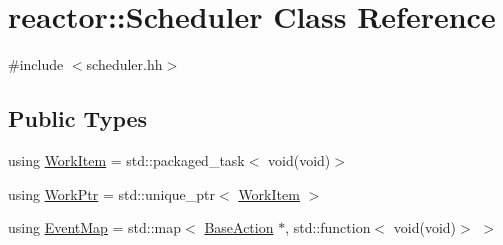 \hypertarget{classreactor_1_1Scheduler}{}\section{reactor\+:\+:Scheduler Class Reference}
\label{classreactor_1_1Scheduler}


{\ttfamily \#include $<$scheduler.\+hh$>$}

\subsection*{Public Types}
\begin{DoxyCompactItemize}
\item 
using \hyperlink{classreactor_1_1Scheduler_a5a4a25635fcb20f268876a0bf70eb68e}{Work\+Item} = std\+::packaged\+\_\+task$<$ void(void)$>$
\item 
using \hyperlink{classreactor_1_1Scheduler_a4a4934dc58f294069b8c64435cdfe564}{Work\+Ptr} = std\+::unique\+\_\+ptr$<$ \hyperlink{classreactor_1_1Scheduler_a5a4a25635fcb20f268876a0bf70eb68e}{Work\+Item} $>$
\item 
using \hyperlink{classreactor_1_1Scheduler_aa32e06a71b7406a238616cc5d7b55610}{Event\+Map} = std\+::map$<$ \hyperlink{classreactor_1_1BaseAction}{Base\+Action} $\ast$, std\+::function$<$ void(void)$>$ $>$
\end{DoxyCompactItemize}
